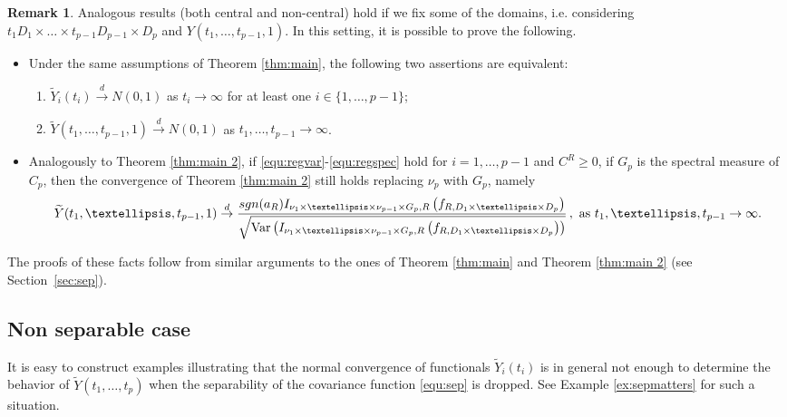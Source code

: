 \documentclass[12pt]{article}
\DeclareMathOperator{\var}{Var}
\DeclareMathOperator{\1}{1}
\theoremstyle{plain}
\theoremstyle{definition}
\newtheorem{remark}{Remark}
\begin{document}
\begin{remark}\label{rem:fixed}
    Analogous results (both central and non-central) hold if we fix some of the domains, i.e. considering $t_1D_1\times\dots \times t_{p-1}D_{p-1}\times D_p$ and $Y(t_1,\dots,t_{p-1},1)$. In this setting, it is possible to prove the following.
    \begin{itemize}
        \item Under the same assumptions of Theorem \ref{thm:main}, the following two assertions are equivalent:
    \begin{enumerate}
        \item[(a)]
        $\widetilde{Y}_{i}(t_i)\overset{d}{\rightarrow} N(0,1)$ as $t_i \to \infty$ for at least one $i\in\{1,\ldots,p-1\}$;   
        \item[(b)]
        $\widetilde{Y}(t_1,\ldots,t_{p-1},1)\overset{d}{\rightarrow} N(0,1)$ as $t_1,\ldots,t_{p-1} \to \infty$.
        \end{enumerate} 
    \item Analogously to Theorem \ref{thm:main 2}, if \eqref{equ:regvar}-\eqref{equ:regspec} hold for $i=1,\dots,p-1$ and $C^R\ge0$, if $G_p$ is the spectral measure of $C_p$, then the convergence of Theorem \ref{thm:main 2} still holds replacing $\nu_p$ with $G_p$, namely
    \begin{equation}
        \widetilde{Y}(t_1,\ldots,t_{p-1},1)\overset{d}{\rightarrow} \frac{{\rm sgn(a_R)}I_{\nu_1\times\ldots\times \nu_{p-1}\times G_p,R}\left(f_{R,D_1\times\ldots\times D_p}\right)}{\sqrt{\var\left(I_{\nu_1\times\ldots\times \nu_{p-1}\times G_p,R}\left(f_{R,D_1\times\ldots\times D_p}\right)\right)}}\,, \ \text{as }t_1,\dots,t_{p-1}\rightarrow\infty .
    \end{equation}
    \end{itemize}
    The proofs of these facts follow from similar arguments to the ones of Theorem \ref{thm:main} and Theorem \ref{thm:main 2} (see Section~\ref{sec:sep}).
\end{remark}

\subsection{Non separable case}

It is easy to construct examples illustrating that the normal convergence of functionals $\widetilde{Y}_i(t_i)$ is in general not enough to determine the behavior of $\widetilde{Y}(t_1,\ldots,t_p)$ when the separability of the covariance function \eqref{equ:sep} is dropped.
See Example \ref{ex:sepmatters} for such a situation.
\end{document}
